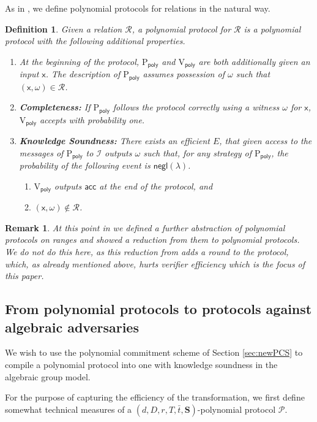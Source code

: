 \documentclass[11pt]{article} %
\newcommand{\negl}{\ensuremath{\mathsf{negl}(\lambda)}\xspace}
\newcommand{\polprot}[6]{$(#1,#2,#3,#4,#5,#6)$-polynomial protocol}
\newcommand{\acc}{\ensuremath{\mathsf{acc}}\xspace}
\newcommand{\prvpoly}{\ensuremath{\mathrm{P_{\mathsf{poly}}}}\xspace}
\newcommand{\verpoly}{\ensuremath{\mathrm{V_{\mathsf{poly}}}}\xspace}
\newcommand{\ideal}{\ensuremath{\mathcal{I}}\xspace}
\newcommand{\inp}{\ensuremath{\mathsf{x}}\xspace}
\newcommand{\wit}{\ensuremath{\omega}\xspace}
\newcommand{\rel}{\ensuremath{\mathcal{R}}\xspace}
\newcommand{\ext}{\ensuremath{E}\xspace}
\newcommand{\prot}{\ensuremath{\mathscr{P}}\xspace}
\newtheorem{dfn}[lemma]{Definition}
\newtheorem{remark}[lemma]{Remark}
\newcommand{\openset}{\ensuremath{\mathbf{S}}\xspace}
\renewcommand{\t}{\ensuremath{\bar{t}}\xspace}
\begin{document}
As in \cite{plonk}, we define polynomial protocols for relations in the natural way.
\begin{dfn}\label{dfn:protforrel}
Given a relation \rel, a \emph{polynomial protocol for \rel} is a polynomial protocol with the following additional properties.
\begin{enumerate}
 \item At the beginning of the protocol, \prvpoly and \verpoly are both additionally given an input \inp. The description of \prvpoly assumes possession of \wit such that $(\inp,\wit)\in \rel$.
 \item \textbf{Completeness:} If \prvpoly follows the protocol correctly using a witness \wit for \inp, \verpoly accepts with probability one.
 \item \textbf{Knowledge Soundness:} There exists an efficient \ext, that given access to the messages of \prvpoly to \ideal outputs \wit such that, for any strategy of \prvpoly, the probability of the following event is \negl.
 \begin{enumerate}
  \item \verpoly outputs \acc at the end of the protocol, and
  \item $(\inp,\wit)\notin \rel$.
 \end{enumerate}

\end{enumerate}
\end{dfn}

\begin{remark}
 At this point in \cite{plonk} we defined a further abstraction of polynomial protocols on ranges and showed a reduction from them to polynomial protocols. We do not do this here, as this reduction from \cite{plonk} adds a round to the protocol, which, as already mentioned above, hurts verifier efficiency which is the focus of this paper.
\end{remark}
\subsection{From polynomial protocols to protocols against algebraic adversaries}\label{subsec:ideal-AGM}
We wish to use the polynomial commitment scheme of Section \ref{sec:newPCS} to compile a polynomial protocol into one with knowledge soundness in the algebraic group model.


For the purpose of capturing the efficiency of the transformation, we first define somewhat technical measures of a \polprot{d}{D}{r}{T}{\t}{\openset} \prot.
\end{document}
